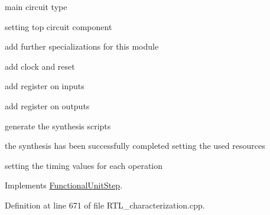 main circuit type

setting top circuit component

add further specializations for this module

add clock and reset

add register on inputs

add register on outputs

generate the synthesis scripts

the synthesis has been successfully completed setting the used resources

setting the timing values for each operation 

Implements \hyperlink{classFunctionalUnitStep_afe8188cf489c2c980bc537f5ed37a5cc}{Functional\+Unit\+Step}.



Definition at line 671 of file R\+T\+L\+\_\+characterization.\+cpp.



